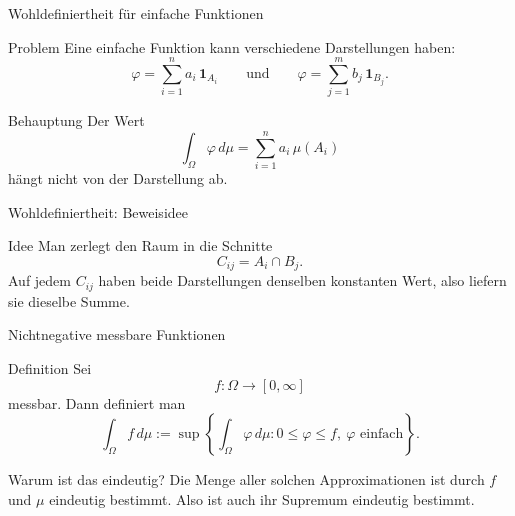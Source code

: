 \documentclass{beamer}
\begin{document}


\begin{frame}{Wohldefiniertheit für einfache Funktionen}
\begin{block}{Problem}
Eine einfache Funktion kann verschiedene Darstellungen haben:
\[
\varphi=\sum_{i=1}^n a_i\,\mathbf 1_{A_i}
\qquad\text{und}\qquad
\varphi=\sum_{j=1}^m b_j\,\mathbf 1_{B_j}.
\]
\end{block}

\begin{block}{Behauptung}
Der Wert
\[
\int_\Omega \varphi\,d\mu
=
\sum_{i=1}^n a_i\,\mu(A_i)
\]
hängt nicht von der Darstellung ab.
\end{block}
\end{frame}

\begin{frame}{Wohldefiniertheit: Beweisidee}
\begin{block}{Idee}
Man zerlegt den Raum in die Schnitte
\[
C_{ij}=A_i\cap B_j.
\]
Auf jedem \(C_{ij}\) haben beide Darstellungen denselben konstanten Wert, also liefern sie dieselbe Summe.
\end{block}
\end{frame}

\begin{frame}{Nichtnegative messbare Funktionen}
\begin{block}{Definition}
Sei
\[
f\colon \Omega\to[0,\infty]
\]
messbar.
Dann definiert man
\[
\int_\Omega f\,d\mu
:=
\sup\left\{
\int_\Omega \varphi\,d\mu :
0\le \varphi\le f,\ \varphi \text{ einfach}
\right\}.
\]
\end{block}

\begin{block}{Warum ist das eindeutig?}
Die Menge aller solchen Approximationen ist durch \(f\) und \(\mu\) eindeutig bestimmt. Also ist auch ihr Supremum eindeutig bestimmt.
\end{block}
\end{frame}
\end{document}
